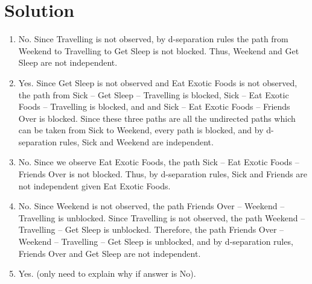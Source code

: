 \documentclass[submit]{harvardml}
\begin{document}
\newpage
\section*{Solution}
\begin{enumerate}
  \item No. Since Travelling is not observed, by d-separation rules the path from Weekend to Travelling to Get Sleep is not blocked. Thus, Weekend and Get Sleep are not independent.
  
  \item Yes. Since Get Sleep is not observed and Eat Exotic Foods is not observed, the path from Sick -- Get Sleep  -- Travelling is blocked, Sick -- Eat Exotic Foods -- Travelling is blocked, and and Sick -- Eat Exotic Foods -- Friends Over is blocked. Since these three paths are all the undirected paths which can be taken from Sick to Weekend, every path is blocked, and by d-separation rules, Sick and Weekend are independent. 
  
  \item  No. Since we observe Eat Exotic Foods, the path Sick -- Eat Exotic Foods -- Friends Over is not blocked. Thus, by d-separation rules, Sick and Friends are not independent given Eat Exotic Foods.
  
  \item No. Since Weekend is not observed, the path Friends Over -- Weekend -- Travelling is unblocked. Since Travelling is not observed, the path Weekend -- Travelling -- Get Sleep is unblocked. Therefore, the path Friends Over -- Weekend -- Travelling -- Get Sleep is unblocked, and by d-separation rules, Friends Over and Get Sleep are not independent. 
  
  \item Yes. (only need to explain why if answer is No).
  

\end{enumerate}
\end{document}

